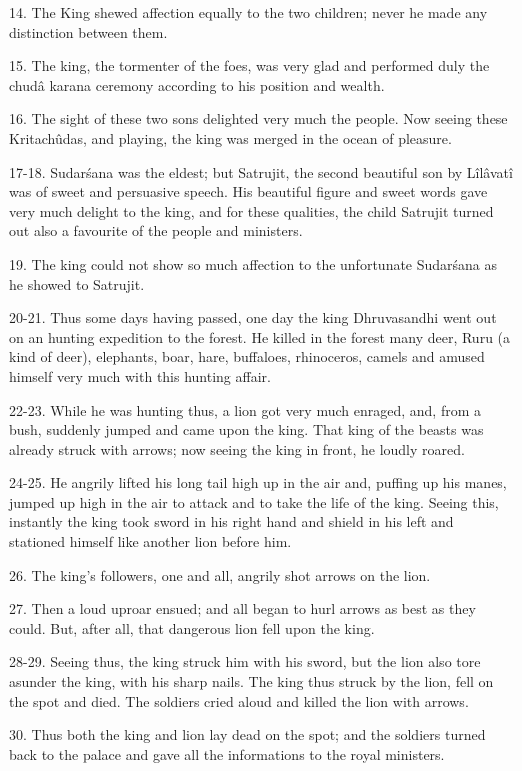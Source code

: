 14. The King shewed affection equally to the two children; never he made any distinction between them.

15. The king, the tormenter of the foes, was very glad and performed duly the chud\^a karana ceremony according to his position and wealth.

16. The sight of these two sons delighted very much the people. Now seeing these Kritachûdas, and playing, the king was merged in the ocean of pleasure.

17-18. Sudar\'sana was the eldest; but Satrujit, the second beautiful son by L\^il\^avat\^i was of sweet and persuasive speech. His beautiful figure and sweet words gave very much delight to the king, and for these qualities, the child Satrujit turned out also a favourite of the people and ministers.

19. The king could not show so much affection to the unfortunate Sudar\'sana as he showed to Satrujit.

20-21. Thus some days having passed, one day the king Dhruvasandhi went out on an hunting expedition to the forest. He killed in the forest many deer, Ruru (a kind of deer), elephants, boar, hare, buffaloes, rhinoceros, camels and amused himself very much with this hunting affair.

22-23. While he was hunting thus, a lion got very much enraged, and, from a bush, suddenly jumped and came upon the king. That king of the beasts was already struck with arrows; now seeing the king in front, he loudly roared.

24-25. He angrily lifted his long tail high up in the air and, puffing up his manes, jumped up high in the air to attack and to take the life of the king. Seeing this, instantly the king took sword in his right hand and shield in his left and stationed himself like another lion before him.

26. The king's followers, one and all, angrily shot arrows on the lion.

27. Then a loud uproar ensued; and all began to hurl arrows as best as they could. But, after all, that dangerous lion fell upon the king.

28-29. Seeing thus, the king struck him with his sword, but the lion also tore asunder the king, with his sharp nails. The king thus struck by the lion, fell on the spot and died. The soldiers cried aloud and killed the lion with arrows.

30. Thus both the king and lion lay dead on the spot; and the soldiers turned back to the palace and gave all the informations to the royal ministers.


